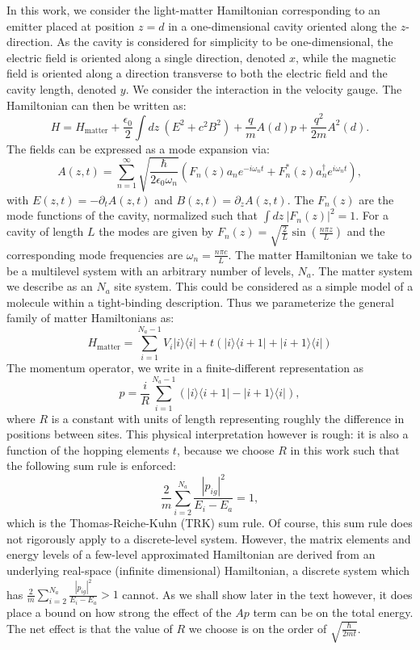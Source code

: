 \documentclass[aps,prb,twocolumn,
	groupedaddress,superscriptaddress,
	amsfonts,amssymb,amsmath,floatfix,
	citeautoscript]{revtex4-1}
\begin{document}
In this work, we consider the light-matter Hamiltonian corresponding to an emitter placed at position $z=d$ in a one-dimensional cavity oriented along the $z$-direction. As the cavity is considered for simplicity to be one-dimensional, the electric field is oriented along a single direction, denoted $x$, while the magnetic field is oriented along a direction transverse to both the electric field and the cavity length, denoted $y$. We consider the interaction in the velocity gauge. The Hamiltonian can then be written as:
\begin{equation}
H = H_{\text{matter}}+\frac{\epsilon_0}{2}\int dz~(E^2+c^2B^2)+\frac{q}{m}A(d)p + \frac{q^2}{2m}A^2(d).
\end{equation}
The fields can be expressed as a mode expansion via:
\begin{equation}
A(z,t) = \sum\limits_{n=1}^{\infty} \sqrt{\frac{\hbar}{2\epsilon_0\omega_n }}(F_n(z)a_ne^{-i\omega_n t}+F^*_n(z)a_n^{\dagger}e^{i\omega_n t}),
\end{equation}
with $E(z,t) = -\partial_t A(z,t)$ and $B(z,t)=\partial_z A(z,t)$.  The $F_n(z)$ are the mode functions of the cavity, normalized such that $\int dz ~|F_n(z)|^2 = 1$. For a cavity of length $L$ the modes are given by $F_n(z) = \sqrt{\frac{2}{L}}\sin\left(\frac{n\pi z}{L} \right)$ and the corresponding mode frequencies are $\omega_n = \frac{n\pi c}{L}$. The matter Hamiltonian we take to be a multilevel system with an arbitrary number of levels, $N_a$. The matter system we describe as an $N_a$ site system. This could be considered as a simple model of a molecule within a tight-binding description. Thus we parameterize the general family of matter Hamiltonians as:
\begin{equation}
H_{\text{matter}} = \sum\limits_{i=1}^{{N_a-1}} V_i|i\rangle\langle i|+t(|i\rangle\langle i+1|+|i+1\rangle\langle i|) 
\end{equation}
The momentum operator, we write in a finite-different representation as
\begin{equation}
p = \frac{i}{R}\sum\limits_{i=1}^{N_a-1} \left(|i\rangle\langle i+1|-|i+1\rangle\langle i| \right),
\end{equation}
where $R$ is a constant with units of length representing roughly the difference in positions between sites. This physical interpretation however is rough: it is also a function of the hopping elements $t$, because we choose $R$ in this work such that the following sum rule is enforced:
\begin{equation}
\frac{2}{m}\sum\limits_{i=2}^{N_a}\frac{|p_{ig}|^2}{E_i - E_a} = 1,
\end{equation}
which is the Thomas-Reiche-Kuhn (TRK) sum rule. Of course, this sum rule does not rigorously apply to a discrete-level system. However, the matrix elements and energy levels of a few-level approximated Hamiltonian  are derived from an underlying real-space (infinite dimensional) Hamiltonian, a discrete system which has  $\frac{2}{m}\sum\limits_{i=2}^{N_a}\frac{|p_{ig}|^2}{E_i - E_a} > 1$ cannot. As we shall show later in the text however, it does place a bound on how strong the effect of the $Ap$ term can be on the total energy. The net effect is that the value of $R$ we choose is on the order of $\sqrt{\frac{\hbar}{2mt}}$.
\end{document}
